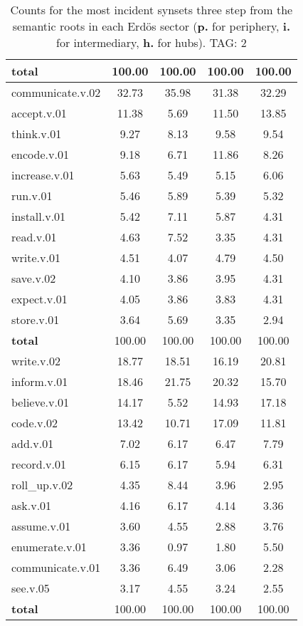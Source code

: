 \begin{table}[h!]
\begin{center}
\begin{tabular}{| l || c | c | c | c |}
{{\bf total}} & 100.00  & 100.00  & 100.00  & 100.00 \\\hline\hline\hline
communicate.v.02 & 32.73  & 35.98  & 31.38  & 32.29 \\\hline
accept.v.01 & 11.38  & 5.69  & 11.50  & 13.85 \\\hline
think.v.01 & 9.27  & 8.13  & 9.58  & 9.54 \\\hline
encode.v.01 & 9.18  & 6.71  & 11.86  & 8.26 \\\hline
increase.v.01 & 5.63  & 5.49  & 5.15  & 6.06 \\\hline
run.v.01 & 5.46  & 5.89  & 5.39  & 5.32 \\\hline
install.v.01 & 5.42  & 7.11  & 5.87  & 4.31 \\\hline
read.v.01 & 4.63  & 7.52  & 3.35  & 4.31 \\\hline
write.v.01 & 4.51  & 4.07  & 4.79  & 4.50 \\\hline
save.v.02 & 4.10  & 3.86  & 3.95  & 4.31 \\\hline
expect.v.01 & 4.05  & 3.86  & 3.83  & 4.31 \\\hline
store.v.01 & 3.64  & 5.69  & 3.35  & 2.94 \\\hline\hline
{{\bf total}} & 100.00  & 100.00  & 100.00  & 100.00 \\\hline\hline\hline
write.v.02 & 18.77  & 18.51  & 16.19  & 20.81 \\\hline
inform.v.01 & 18.46  & 21.75  & 20.32  & 15.70 \\\hline
believe.v.01 & 14.17  & 5.52  & 14.93  & 17.18 \\\hline
code.v.02 & 13.42  & 10.71  & 17.09  & 11.81 \\\hline
add.v.01 & 7.02  & 6.17  & 6.47  & 7.79 \\\hline
record.v.01 & 6.15  & 6.17  & 5.94  & 6.31 \\\hline
roll\_up.v.02 & 4.35  & 8.44  & 3.96  & 2.95 \\\hline
ask.v.01 & 4.16  & 6.17  & 4.14  & 3.36 \\\hline
assume.v.01 & 3.60  & 4.55  & 2.88  & 3.76 \\\hline
enumerate.v.01 & 3.36  & 0.97  & 1.80  & 5.50 \\\hline
communicate.v.01 & 3.36  & 6.49  & 3.06  & 2.28 \\\hline
see.v.05 & 3.17  & 4.55  & 3.24  & 2.55 \\\hline\hline
{{\bf total}} & 100.00  & 100.00  & 100.00  & 100.00 \\\hline
\end{tabular}
\caption{Counts for the most incident synsets three step from the semantic roots in each Erd\"os sector ({\bf p.} for periphery, {\bf i.} for intermediary, {\bf h.} for hubs). TAG: 2}
\end{center}
\end{table}